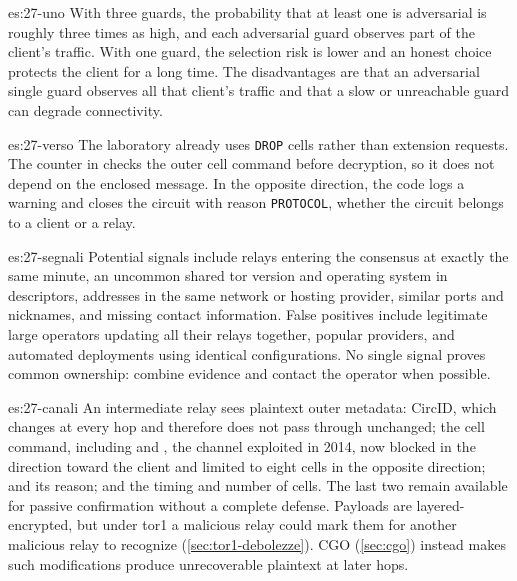 \begin{soluzione}{es:27-uno}
With three guards, the probability that at least one is adversarial is roughly three times as high, and each adversarial guard observes part of the client's traffic. With one guard, the selection risk is lower and an honest choice protects the client for a long time. The disadvantages are that an adversarial single guard observes all that client's traffic and that a slow or unreachable guard can degrade connectivity.
\end{soluzione}

\begin{soluzione}{es:27-verso}
The laboratory already uses \texttt{DROP} cells rather than extension requests. The counter in  checks the outer cell command before decryption, so it does not depend on the enclosed message. In the opposite direction, the code logs a warning and closes the circuit with reason \texttt{PROTOCOL}, whether the circuit belongs to a client or a relay.
\end{soluzione}

\begin{soluzione}{es:27-segnali}
Potential signals include relays entering the consensus at exactly the same minute, an uncommon shared tor version and operating system in descriptors, addresses in the same network or hosting provider, similar ports and nicknames, and missing contact information. False positives include legitimate large operators updating all their relays together, popular providers, and automated deployments using identical configurations. No single signal proves common ownership: combine evidence and contact the operator when possible.
\end{soluzione}

\begin{soluzione}{es:27-canali}
An intermediate relay sees plaintext outer metadata: CircID, which changes at every hop and therefore does not pass through unchanged; the cell command, including  and , the channel exploited in 2014, now blocked in the direction toward the client and limited to eight cells in the opposite direction;  and its reason; and the timing and number of cells. The last two remain available for passive confirmation without a complete defense. Payloads are layered-encrypted, but under tor1 a malicious relay could mark them for another malicious relay to recognize (\cref{sec:tor1-debolezze}). CGO (\cref{sec:cgo}) instead makes such modifications produce unrecoverable plaintext at later hops.
\end{soluzione}
